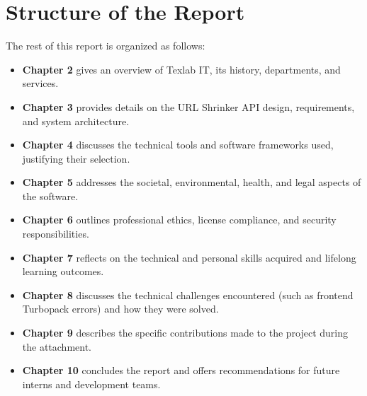 \section{Structure of the Report}
The rest of this report is organized as follows:
\begin{itemize}
    \item \textbf{Chapter 2} gives an overview of Texlab IT, its history, departments, and services.
    \item \textbf{Chapter 3} provides details on the URL Shrinker API design, requirements, and system architecture.
    \item \textbf{Chapter 4} discusses the technical tools and software frameworks used, justifying their selection.
    \item \textbf{Chapter 5} addresses the societal, environmental, health, and legal aspects of the software.
    \item \textbf{Chapter 6} outlines professional ethics, license compliance, and security responsibilities.
    \item \textbf{Chapter 7} reflects on the technical and personal skills acquired and lifelong learning outcomes.
    \item \textbf{Chapter 8} discusses the technical challenges encountered (such as frontend Turbopack errors) and how they were solved.
    \item \textbf{Chapter 9} describes the specific contributions made to the project during the attachment.
    \item \textbf{Chapter 10} concludes the report and offers recommendations for future interns and development teams.
\end{itemize}

